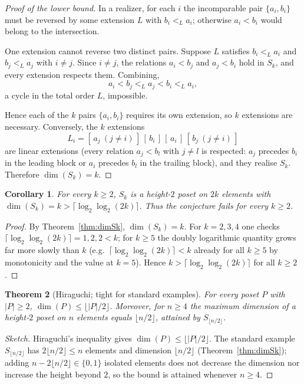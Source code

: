 \documentclass[11pt]{article}
\newtheorem{theorem}{Theorem}
\newtheorem{corollary}[theorem]{Corollary}
\theoremstyle{definition}
\theoremstyle{remark}
\begin{document}
\begin{proof}[Proof of the lower bound]
In a realizer, for each $i$ the incomparable pair $\{a_i,b_i\}$ must be
reversed by some extension $L$ with $b_i <_L a_i$; otherwise $a_i < b_i$ would
belong to the intersection.

One extension cannot reverse two distinct pairs. Suppose $L$ satisfies
$b_i <_L a_i$ and $b_j <_L a_j$ with $i \neq j$. Since $i \neq j$, the
relations $a_i < b_j$ and $a_j < b_i$ hold in $S_k$, and every extension
respects them. Combining,
\[
a_i < b_j <_L a_j < b_i <_L a_i ,
\]
a cycle in the total order $L$, impossible.

Hence each of the $k$ pairs $\{a_i,b_i\}$ requires its own extension, so
$k$ extensions are necessary. Conversely, the $k$ extensions
\[
L_i = [\,a_j\ (j \neq i)\,]\,[\,b_i\,]\,[\,a_i\,]\,[\,b_j\ (j \neq i)\,]
\]
are linear extensions (every relation $a_j < b_l$ with $j \neq l$ is respected:
$a_j$ precedes $b_i$ in the leading block or $a_i$ precedes $b_l$ in the
trailing block), and they realise $S_k$. Therefore $\dim(S_k) = k$.
\end{proof}

\begin{corollary}\label{cor:allk}
For every $k \ge 2$, $S_k$ is a height-$2$ poset on $2k$ elements with
$\dim(S_k) = k > \lceil \log_2\log_2 (2k)\rceil$. Thus the conjecture fails for
every $k \ge 2$.
\end{corollary}

\begin{proof}
By Theorem~\ref{thm:dimSk}, $\dim(S_k)=k$. For $k=2,3,4$ one checks
$\lceil \log_2\log_2(2k)\rceil = 1,2,2 < k$; for $k \ge 5$ the doubly
logarithmic quantity grows far more slowly than $k$ (e.g.\
$\lceil\log_2\log_2(2k)\rceil < k$ already for all $k \ge 5$ by monotonicity and
the value at $k=5$). Hence $k > \lceil \log_2\log_2(2k)\rceil$ for all
$k \ge 2$.
\end{proof}

\begin{theorem}[Hiraguchi; tight for standard examples]\label{thm:floor}
For every poset $P$ with $|P| \ge 2$, $\dim(P) \le \lfloor |P|/2\rfloor$.
Moreover, for $n \ge 4$ the maximum dimension of a height-$2$ poset on $n$
elements equals $\lfloor n/2\rfloor$, attained by
$S_{\lfloor n/2\rfloor}$.
\end{theorem}

\begin{proof}[Sketch]
Hiraguchi's inequality gives $\dim(P) \le \lfloor |P|/2\rfloor$. The standard
example $S_{\lfloor n/2\rfloor}$ has $2\lfloor n/2\rfloor \le n$ elements and
dimension $\lfloor n/2\rfloor$ (Theorem~\ref{thm:dimSk}); adding
$n-2\lfloor n/2\rfloor \in \{0,1\}$ isolated elements does not decrease the
dimension nor increase the height beyond $2$, so the bound is attained whenever
$n \ge 4$.
\end{proof}
\end{document}
